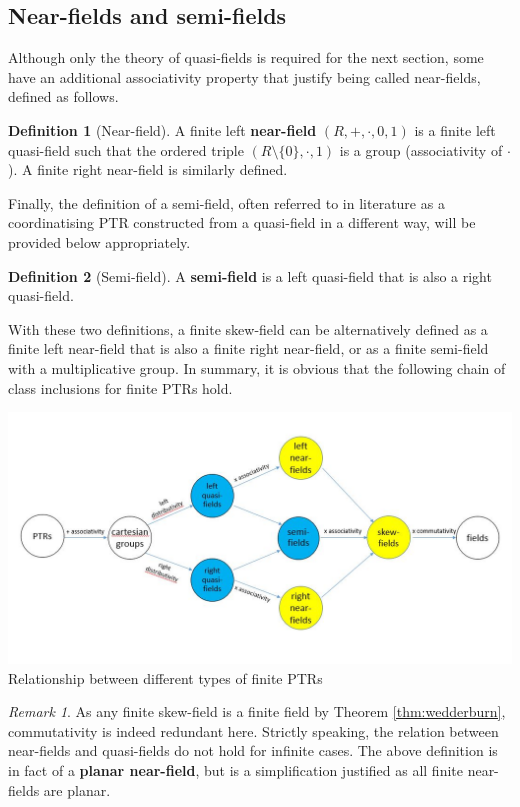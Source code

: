 \documentclass{report}
\theoremstyle{definition}\newtheorem*{definition}{Definition}
\theoremstyle{definition}\newtheorem*{example}{Example}
\theoremstyle{remark}\newtheorem*{remark}{Remark}
\begin{document}
\subsection{Near-fields and semi-fields}

Although only the theory of quasi-fields is required for the next section, some have an additional associativity property that justify being called near-fields, defined as follows.

\begin{definition}[Near-field]
A finite left \textbf{near-field} $ (R, +, \cdot, 0, 1) $ is a finite left quasi-field such that the ordered triple $ (R \setminus \{ 0 \}, \cdot, 1) $ is a group (associativity of $ \cdot $). A finite right near-field is similarly defined.
\end{definition}

Finally, the definition of a semi-field, often referred to in literature as a coordinatising PTR constructed from a quasi-field in a different way, will be provided below appropriately.

\begin{definition}[Semi-field]
A \textbf{semi-field} is a left quasi-field that is also a right quasi-field.
\end{definition}

With these two definitions, a finite skew-field can be alternatively defined as a finite left near-field that is also a finite right near-field, or as a finite semi-field with a multiplicative group. In summary, it is obvious that the following chain of class inclusions for finite PTRs hold.

\begin{center}
\includegraphics[width=\textwidth]{commutative.jpg}
Relationship between different types of finite PTRs
\end{center}

\begin{remark}
As any finite skew-field is a finite field by Theorem \ref{thm:wedderburn}, commutativity is indeed redundant here. Strictly speaking, the relation between near-fields and quasi-fields do not hold for infinite cases. The above definition is in fact of a \textbf{planar near-field}, but is a simplification justified as all finite near-fields are planar.
\end{remark}
\end{document}

